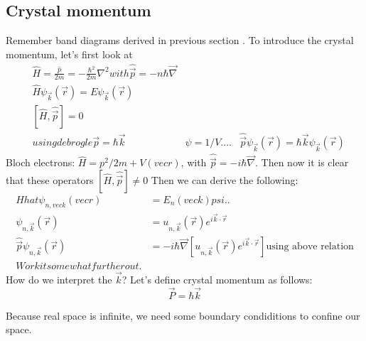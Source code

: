\chapter{}
\section{Crystal momentum}
Remember band diagrams derived in previous section . To introduce the crystal momentum, let's first look at
\begin{align}
	&\hat{H} = \frac{\hat{p}}{2m} = -\frac{\hbar^2}{2m}\nabla^2 with \hat{\vec{p}} = -n\hbar\vec{\nabla}\\
	&\hat{H}\psi_{\vec{k}}(\vec{r}) = E \psi_{\vec{k}}(\vec{r})\\
	&[\hat{H}, \hat{\vec{p}}] = 0\\
	&using de brogle \vec{p} = \hbar\vec{k}
	&\psi = 1/V....
	&\hat{\vec{p}}\psi_{\vec{k}}(\vec{r}) = \hbar\vec{k}\psi_{\vec{k}}(\vec{r})
\end{align}
Bloch electrons: $\hat{H} = p^2/2m + V(vecr)$, with $\hat{\vec{p}} = -i\hbar\vec{\nabla}$. 
Then now it is clear that these operators $[\hat{H}, \hat{\vec{p}}] \neq 0$
Then we can derive the following:
\begin{align}
	Hhat\psi_{n, veck}(vecr) &= E_n(veck)psi..\\
	\psi_{n, \vec{k}}(\vec{r}) &= u_{n, \vec{k}}(\vec{r})e^{i\vec{k}\cdot\vec{r}}\\
	\hat{\vec{p}}\psi_{n, \vec{k}}(\vec{r}) &= -i\hbar\vec{\nabla}\left[u_{n, \vec{k}}(\vec{r})e^{i\vec{k}\cdot\vec{r}}\right] \text{using above relation}\\
	Work it somewhat further out.
\end{align}
How do we interpret the $\vec{k}$? Let's define crystal momentum as follows:
\begin{equation}
	\vec{P} = \hbar\vec{k}
\end{equation}

Because real space is infinite, we need some boundary condiditions to confine our space.
